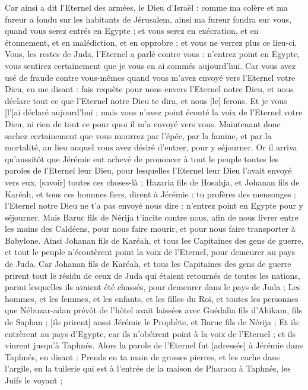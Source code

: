 \begin{multicols}{2}
Car ainsi a dit l'Eternel des armées, le Dieu d'Israël : comme ma colère et ma fureur a fondu sur les habitants de Jérusalem, ainsi ma fureur fondra sur vous, quand vous serez entrés en Egypte ; et vous serez en exécration, et en étonnement, et en malédiction, et en opprobre ; et vous ne verrez plus ce lieu-ci.
Vous, les restes de Juda, l'Eternel a parlé contre vous : n'entrez point en Egypte, vous sentirez certainement que je vous en ai sommés aujourd'hui.
Car vous avez usé de fraude contre vous-mêmes quand vous m'avez envoyé vers l'Eternel votre Dieu, en me disant : fais requête pour nous envers l'Eternel notre Dieu, et nous déclare tout ce que l'Eternel notre Dieu te dira, et nous [le] ferons.
Et je vous [l']ai déclaré aujourd'hui ; mais vous n'avez point écouté la voix de l'Eternel votre Dieu, ni rien de tout ce pour quoi il m'a envoyé vers vous.
Maintenant donc sachez certainement que vous mourrez par l'épée, par la famine, et par la mortalité, au lieu auquel vous avez désiré d'entrer, pour y séjourner.
\VerseOne{}Or il arriva qu'aussitôt que Jérémie eut achevé de prononcer à tout le peuple toutes les paroles de l'Eternel leur Dieu, pour lesquelles l'Eternel leur Dieu l'avait envoyé vers eux, [savoir] toutes ces choses-là ;
Hazaria fils de Hosahja, et Johanan fils de Karéah, et tous ces hommes fiers, dirent à Jérémie : tu profères des mensonges ; l'Eternel notre Dieu ne t'a pas envoyé nous dire : n'entrez point en Egypte pour y séjourner.
Mais Baruc fils de Nérija t'incite contre nous, afin de nous livrer entre les mains des Caldéens, pour nous faire mourir, et pour nous faire transporter à Babylone.
Ainsi Johanan fils de Karéah, et tous les Capitaines des gens de guerre, et tout le peuple n'écoutèrent point la voix de l'Eternel, pour demeurer au pays de Juda.
Car Johanan fils de Karéah, et tous les Capitaines des gens de guerre prirent tout le résidu de ceux de Juda qui étaient retournés de toutes les nations, parmi lesquelles ils avaient été chassés, pour demeurer dans le pays de Juda ;
Les hommes, et les femmes, et les enfants, et les filles du Roi, et toutes les personnes que Nébuzar-adan prévôt de l'hôtel avait laissées avec Guédalia fils d'Ahikam, fils de Saphan ; [ils prirent] aussi Jérémie le Prophète, et Baruc fils de Nérija ;
Et ils entrèrent au pays d'Egypte, car ils n'obéirent point à la voix de l'Eternel ; et ils vinrent jusqu'à Taphnés.
Alors la parole de l'Eternel fut [adressée] à Jérémie dans Taphnés, en disant :
Prends en ta main de grosses pierres, et les cache dans l'argile, en la tuilerie qui est à l'entrée de la maison de Pharaon à Taphnés, les Juifs le voyant ;

\end{multicols}

